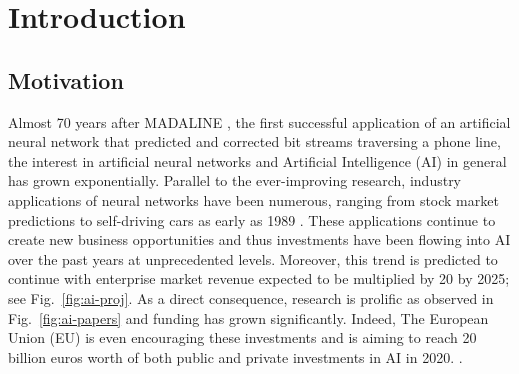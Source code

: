 \section{Introduction}

\subsection{Motivation}

Almost 70 years after MADALINE \cite{adaline}, the first successful application of an artificial neural network that predicted and corrected bit streams traversing a phone line, the interest in artificial neural networks and Artificial Intelligence (AI) in general has grown exponentially. Parallel to the ever-improving research, industry applications of neural networks have been numerous, ranging from stock market predictions \cite{smp} to self-driving cars as early as 1989 \cite{alvinn}. These applications continue to create new business opportunities and thus investments have been flowing into AI over the past years at unprecedented levels. Moreover, this trend is predicted to continue with enterprise market revenue expected to be multiplied by 20 by 2025; see Fig.~\ref{fig:ai-proj}. As a direct consequence, research is prolific as observed in Fig.~\ref{fig:ai-papers} and funding has grown significantly. Indeed, The European Union (EU) is even encouraging these investments and is aiming to reach 20 billion euros worth of both public and private investments in AI in 2020. \cite{ai-invest}.

